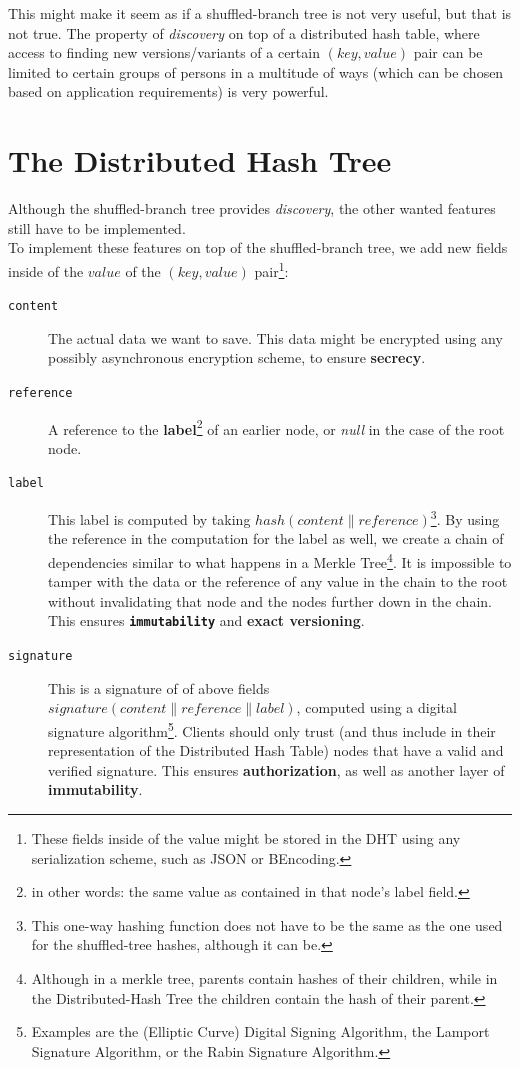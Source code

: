 \documentclass[a4paper]{article}
\begin{document}
This might make it seem as if a shuffled-branch tree is not very useful, but that is not true. The property of \textit{discovery} on top of a distributed hash table, where access to finding new versions/variants of a certain $(key,value)$ pair can be limited to certain groups of persons in a multitude of ways (which can be chosen based on application requirements) is very powerful. 



\section{The Distributed Hash Tree}
Although the shuffled-branch tree provides \textit{discovery}, the other wanted features still have to be implemented.\\


To implement these features on top of the shuffled-branch tree, we add new fields inside of the $value$ of the $(key,value)$ pair\footnote{These fields inside of the value might be stored in the DHT using any serialization scheme, such as JSON or BEncoding.}:


\begin{description}
	\item[\texttt{content}] The actual data we want to save. This data might be encrypted using any possibly asynchronous encryption scheme, to ensure \textbf{secrecy}.
	\item[\texttt{reference}] A reference to the \textbf{label}\footnote{in other words: the same value as contained in that node's label field.} of an earlier node, or \textit{null} in the case of the root node.
	\item[\texttt{label}] This label is computed by taking $hash(content \parallel reference)$\footnote{This one-way hashing function does not have to be the same as the one used for the shuffled-tree hashes, although it can be.}. By using the reference in the computation for the label as well, we create a chain of dependencies similar to what happens in a Merkle Tree\footnote{%
	Although in a merkle tree, parents contain hashes of their children, while in the Distributed-Hash Tree the children contain the hash of their parent.}. It is impossible to tamper with the data or the reference of any value in the chain to the root without invalidating that node and the nodes further down in the chain. This ensures \textbf{\texttt{immutability}} and \textbf{exact versioning}.
	\item[\texttt{signature}] This is a signature of of above fields $signature(content \parallel reference \parallel label)$, computed using a digital signature algorithm\footnote{Examples are the (Elliptic Curve) Digital Signing Algorithm, the Lamport Signature Algorithm, or the Rabin Signature Algorithm.}. Clients should only trust (and thus include in their representation of the Distributed Hash Table) nodes that have a valid and verified signature. This ensures \textbf{authorization}, as well as another layer of \textbf{immutability}.
\end{description}
\end{document}
